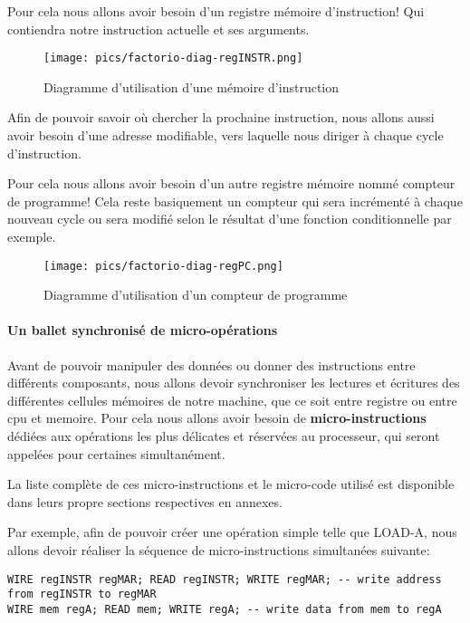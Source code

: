 Pour cela nous allons avoir besoin d'un registre mémoire d'instruction!
Qui contiendra notre instruction actuelle et ses arguments.
\begin{figure}[h]
\centering
\texttt{[image: pics/factorio-diag-regINSTR.png]}

\caption{Diagramme d'utilisation d'une mémoire d'instruction}
\end{figure}

Afin de pouvoir savoir où chercher la prochaine instruction, nous allons aussi avoir besoin d'une adresse modifiable, vers laquelle nous diriger à chaque cycle d'instruction.

Pour cela nous allons avoir besoin d'un autre registre mémoire nommé compteur de programme!
Cela reste basiquement un compteur qui sera incrémenté à chaque nouveau cycle ou sera modifié selon le résultat d'une fonction conditionnelle par exemple.


\begin{figure}[h]
\centering
\texttt{[image: pics/factorio-diag-regPC.png]}

\caption{Diagramme d'utilisation d'un compteur de programme}
\end{figure}

\paragraph{Un ballet synchronisé de micro-opérations}
Avant de pouvoir manipuler des données ou donner des instructions entre différents composants, nous allons devoir synchroniser les lectures et écritures des différentes cellules mémoires de notre machine, que ce soit entre registre ou entre cpu et memoire.
Pour cela nous allons avoir besoin de \textbf{micro-instructions} dédiées aux opérations les plus délicates et réservées au processeur, qui seront appelées pour certaines simultanément. 

\begin{info}
La liste complète de ces micro-instructions et le micro-code utilisé est disponible dans leurs propre sections respectives en annexes.
\end{info}

Par exemple, afin de pouvoir créer une opération simple telle que LOAD-A, nous allons devoir réaliser la séquence de micro-instructions simultanées suivante: 

\begin{verbatim}
WIRE regINSTR regMAR; READ regINSTR; WRITE regMAR; -- write address from regINSTR to regMAR
WIRE mem regA; READ mem; WRITE regA; -- write data from mem to regA
\end{verbatim}



